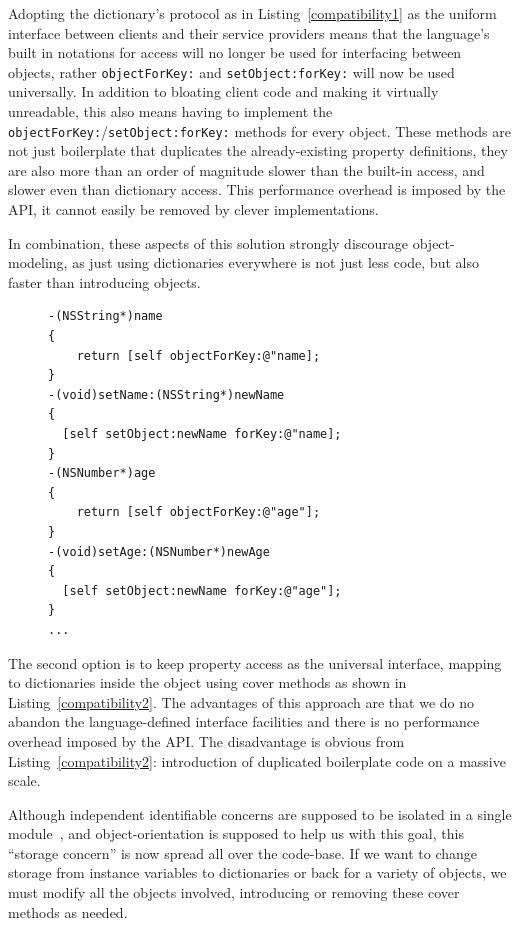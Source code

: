 \documentclass[preprint]{sigplanconf}
\begin{document}
Adopting the dictionary's protocol as in Listing~\ref{compatibility1} as the uniform interface between
clients and their service providers means 
that the language's built in notations for access will no longer be used for interfacing between
objects, rather {\tt objectForKey:} and {\tt setObject:forKey:} will now be used universally.  In addition
to bloating client code and making it virtually unreadable, this also means having to implement
the {\tt objectForKey:}/{\tt setObject:forKey:} methods for every object.  These methods are not just
boilerplate that duplicates the already-existing property definitions, they are also more than an order
of magnitude slower than the built-in access, and slower even than dictionary access.  This 
performance overhead is imposed by the API, it cannot easily be removed by clever implementations.

In combination, these aspects of this solution strongly discourage object-modeling, as just using 
dictionaries everywhere is not just less code, but also faster than introducing objects.

\begin{figure}[htbp]
\begin{lstlisting}[style=numbers,label=compatibility2,caption=Making a dictionary object-compatible.]
-(NSString*)name
{
    return [self objectForKey:@"name];
}
-(void)setName:(NSString*)newName
{
  [self setObject:newName forKey:@"name];
}
-(NSNumber*)age
{
    return [self objectForKey:@"age"];
}
-(void)setAge:(NSNumber*)newAge 
{
  [self setObject:newName forKey:@"age"];
}
...
\end{lstlisting}
\end{figure}

The second option is to keep property access as the universal interface, mapping to dictionaries
inside the object using cover methods as shown in Listing~\ref{compatibility2}.  The advantages
of this approach are that we do no abandon the language-defined interface facilities and
there is no performance overhead imposed by the API.  The disadvantage is obvious from
Listing~\ref{compatibility2}:  introduction of duplicated boilerplate code on a massive scale.

Although independent identifiable concerns are supposed to be isolated in a single module~\cite{Parnas72},
and object-orientation is supposed to help us with this goal,
this ``storage concern'' is now spread all over the code-base.  If we want to change storage
from instance variables to dictionaries or back for a variety of objects, we must modify all
the objects involved, introducing or removing these cover methods as needed. 
\end{document}
